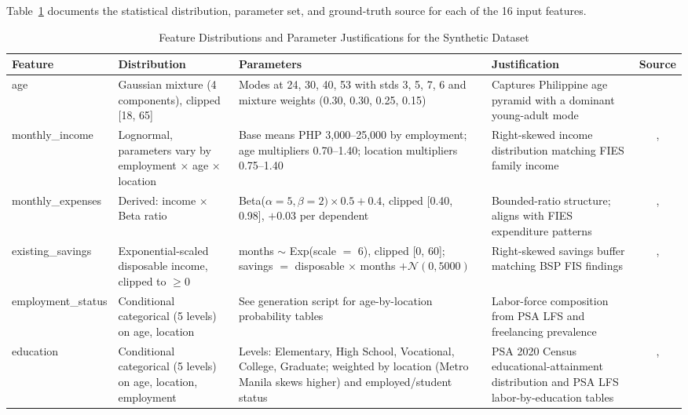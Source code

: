 \documentclass[journal]{./IEEE/IEEEtran}
\begin{document}
Table~\ref{tab:features} documents the statistical distribution, parameter set, and ground-truth source for each of the 16 input features.

\begin{table}[t]
    \centering
    \caption{Feature Distributions and Parameter Justifications for the Synthetic Dataset}
    \label{tab:features}
    \small
    \begin{tabular}{|l|p{2.8cm}|p{3.6cm}|p{5.0cm}|c|}
        \hline
        \textbf{Feature} & \textbf{Distribution} & \textbf{Parameters} & \textbf{Justification} & \textbf{Source} \\
        \hline
        age & Gaussian mixture (4 components), clipped [18, 65] & Modes at 24, 30, 40, 53 with stds 3, 5, 7, 6 and mixture weights (0.30, 0.30, 0.25, 0.15) & Captures Philippine age pyramid with a dominant young-adult mode & \cite{ref39} \\
        \hline
        monthly\_income & Lognormal, parameters vary by employment × age × location & Base means PHP 3{,}000--25{,}000 by employment; age multipliers 0.70--1.40; location multipliers 0.75--1.40 & Right-skewed income distribution matching FIES family income & \cite{ref40}, \cite{ref54} \\
        \hline
        monthly\_expenses & Derived: income $\times$ Beta ratio & Beta($\alpha{=}5, \beta{=}2) \times 0.5 + 0.4$, clipped [0.40, 0.98], $+$0.03 per dependent & Bounded-ratio structure; aligns with FIES expenditure patterns & \cite{ref40}, \cite{ref55} \\
        \hline
        existing\_savings & Exponential-scaled disposable income, clipped to $\geq 0$ & months $\sim$ Exp(scale $=$ 6), clipped [0, 60]; savings $=$ disposable $\times$ months $+ \mathcal{N}(0, 5000)$ & Right-skewed savings buffer matching BSP FIS findings & \cite{ref35}, \cite{ref66} \\
        \hline
        employment\_status & Conditional categorical (5 levels) on age, location & See generation script for age-by-location probability tables & Labor-force composition from PSA LFS and freelancing prevalence & \cite{ref41} \\
        \hline
        education & Conditional categorical (5 levels) on age, location, employment & Levels: Elementary, High School, Vocational, College, Graduate; weighted by location (Metro Manila skews higher) and employed/student status & PSA 2020 Census educational-attainment distribution and PSA LFS labor-by-education tables & \cite{ref39}, \cite{ref41} \\

\end{tabular}
\end{table}
\end{document}
